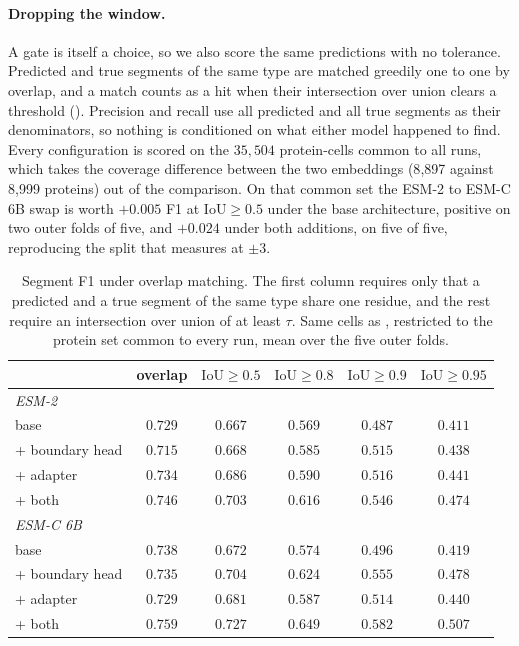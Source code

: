 \documentclass{article}
\begin{document}
\paragraph{Dropping the window.} A gate is itself a choice, so we also score the same predictions
with no tolerance. Predicted and true segments of the same type are matched greedily one to one by
overlap, and a match counts as a hit when their intersection over union clears a threshold
().
Precision and recall use all predicted and all true segments as their denominators, so nothing is
conditioned on what either model happened to find. Every configuration is scored on the
$35{,}504$ protein-cells common to all runs, which takes the coverage difference between the two
embeddings (8{,}897 against 8{,}999 proteins) out of the comparison. On that common set the ESM-2
to ESM-C 6B swap is worth $+0.005$ F1 at $\mathrm{IoU}\ge0.5$ under the base architecture, positive on two outer folds of
five, and $+0.024$ under both additions, on five of five, reproducing the split that
 measures at $\pm3$.

\begin{table}[h]
\centering
\caption{Segment F1 under overlap matching. The first column requires only that a predicted and a
true segment of the same type share one residue, and the rest require an intersection over union of at
least $\tau$. Same cells as , restricted to the protein set common to every
run, mean over the five outer folds.}
\label{tab:iou}
\small
\begin{tabular}{lccccc}
\toprule
& overlap & $\mathrm{IoU}\ge0.5$ & $\mathrm{IoU}\ge0.8$ & $\mathrm{IoU}\ge0.9$ & $\mathrm{IoU}\ge0.95$ \\
\midrule
\multicolumn{6}{l}{\emph{ESM-2}}\\
base & $0.729$ & $0.667$ & $0.569$ & $0.487$ & $0.411$ \\
\quad + boundary head & $0.715$ & $0.668$ & $0.585$ & $0.515$ & $0.438$ \\
\quad + adapter & $0.734$ & $0.686$ & $0.590$ & $0.516$ & $0.441$ \\
\quad + both & $0.746$ & $0.703$ & $0.616$ & $0.546$ & $0.474$ \\
\midrule
\multicolumn{6}{l}{\emph{ESM-C 6B}}\\
base & $0.738$ & $0.672$ & $0.574$ & $0.496$ & $0.419$ \\
\quad + boundary head & $0.735$ & $0.704$ & $0.624$ & $0.555$ & $0.478$ \\
\quad + adapter & $0.729$ & $0.681$ & $0.587$ & $0.514$ & $0.440$ \\
\quad + both & $0.759$ & $0.727$ & $0.649$ & $0.582$ & $0.507$ \\
\bottomrule
\end{tabular}
\end{table}
\end{document}
